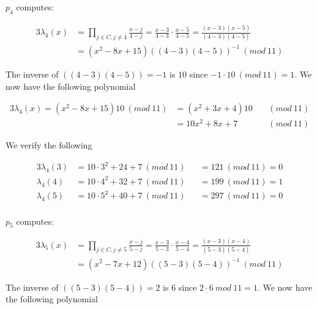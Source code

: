 \noindent
$p_4$ computes:

\noindent
\begin{alignat*}{3}
 \lambda_4(x)&=\prod\limits_{j\in C,j\neq4} \frac{x-j}{4-j} = \frac{x-3}{4-3} \cdot \frac{x-5}{4-5} =\frac{(x-3)(x-5)}{(4-3)(4-5)}\\ 
 &= (x^2-8x+15)((4-3)(4-5))^{-1} \ (mod \ 11)
\end{alignat*}



\noindent
The inverse of  $((4-3)(4-5))= -1$ is $10$ since $-1 \cdot 10 \ (mod \ 11) = 1$. We now have the following polynomial


\noindent
\begin{alignat*}{3}
\lambda_4(x) = (x^2-8x+15)10 \ (mod \ 11) &= (x^2 + 3x+4)10 \ &&(mod \ 11) \\
                                          &= 10x^2 + 8x + 7 \ &&(mod \ 11) 
\end{alignat*}

\noindent
We verify the following

\noindent
\begin{alignat*}{3}
\lambda_4(3) &=  10 \cdot 3^2+24+ 7  \ (mod \ 11) &&= 121 \ (mod \ 11) = 0 \\
\lambda_4(4) &=  10 \cdot 4^2+32+ 7  \ (mod \ 11) &&= 199 \ (mod \ 11) = 1 \\
\lambda_4(5) &=  10 \cdot 5^2+40+ 7  \ (mod \ 11) &&= 297 \ (mod \ 11) = 0 \\
\end{alignat*}




\noindent
$p_5$ computes:

\noindent
\begin{alignat*}{3}
 \lambda_5(x)&=\prod\limits_{j\in C,j\neq5} \frac{x-j}{5-j} = \frac{x-3}{5-3} \cdot \frac{x-4}{5-4} =\frac{(x-3)(x-4)}{(5-3)(5-4)} \\
&= (x^2-7x+12)((5-3)(5-4))^{-1} \ (mod \ 11)
\end{alignat*}



\noindent
The inverse of  $((5-3)(5-4))= 2$ is $6$ since $2 \cdot 6 \ mod \ 11 = 1$. We now have the following polynomial

